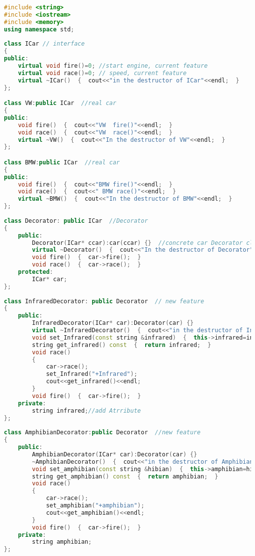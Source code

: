 \documentclass{book}
\begin{document}
\begin{lstlisting}[caption={Decorator Pattern sample 2}, language=C++]
#include <string>  
#include <iostream>  
#include <memory>  
using namespace std;  
  
class ICar // interface 
{  
public:  
    virtual void fire()=0; //start engine, current feature
    virtual void race()=0; // speed, current feature
    virtual ~ICar()  {  cout<<"in the destructor of ICar"<<endl;  }     
};  

class VW:public ICar  //real car
{  
public:  
    void fire()  {  cout<<"VW  fire()"<<endl;  }  
    void race()  {  cout<<"VW  race()"<<endl;  }  
    virtual ~VW()  {  cout<<"In the destructor of VW"<<endl;  }  
};  

class BMW:public ICar  //real car
{  
public:  
    void fire()  {  cout<<"BMW fire()"<<endl;  }  
    void race()  {  cout<<" BMW race()"<<endl;  }  
    virtual ~BMW()  {  cout<<"In the destructor of BMW"<<endl;  }  
};  
  
class Decorator: public ICar  //Decorator  
{  
    public:  
        Decorator(ICar* ccar):car(ccar) {}  //concrete car Decorator class  
        virtual ~Decorator()  {  cout<<"In the destructor of Decorator"<<endl;  }  
        void fire()  {  car->fire();  }  
        void race()  {  car->race();  }  
    protected:  
        ICar* car;  
};  
      
class InfraredDecorator: public Decorator  // new feature
{  
    public:  
        InfraredDecorator(ICar* car):Decorator(car) {}  
        virtual ~InfraredDecorator()  {  cout<<"in the destructor of InfraredDecorator"<<endl;  }  
        void set_Infrared(const string &infrared)  {  this->infrared=infrared;  }  
        string get_infrared() const  {  return infrared;  }  
        void race()  
        {  
            car->race();  
            set_Infrared("+Infrared");  
            cout<<get_infrared()<<endl;  
        }  
        void fire()  {  car->fire();  }  
    private:  
        string infrared;//add Atrribute  
};  
      
class AmphibianDecorator:public Decorator  //new feature
{  
    public:  
        AmphibianDecorator(ICar* car):Decorator(car) {}  
        ~AmphibianDecorator()  {  cout<<"in the destructor of AmphibianDecorator"<<endl;  }  
        void set_amphibian(const string &hibian)  {  this->amphibian=hibian;  }  
        string get_amphibian() const  {  return amphibian;  }  
        void race()  
        {  
            car->race();  
            set_amphibian("+amphibian");  
            cout<<get_amphibian()<<endl;  
        }  
        void fire()  {  car->fire();  }  
    private:  
        string amphibian;  
};  
      

\end{lstlisting}
\end{document}
